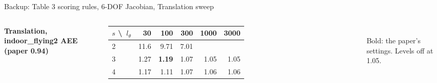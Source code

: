 \documentclass[aspectratio=169,10pt]{beamer}
\begin{document}
\begin{frame}{Backup: Table 3 scoring rules, 6-DOF Jacobian, Translation sweep}
\begin{columns}[T,onlytextwidth]
    \vspace{2mm}
    {\small\textbf{Translation, indoor\_flying2 AEE (paper 0.94)}}\\[1mm]
    \begin{tabular}{@{}lrrrrr@{}}
      \toprule
      $s$ \textbackslash\ $l_\theta$ & 30 & 100 & 300 & 1000 & 3000 \\
      \midrule
      2 & 11.6 & 9.71 & 7.01 & & \\
      3 & 1.27 & \textbf{1.19} & 1.07 & 1.05 & 1.05 \\
      4 & 1.17 & 1.11 & 1.07 & 1.06 & 1.06 \\
      \bottomrule
    \end{tabular}\\[1mm]
    Bold: the paper's settings. Levels off at 1.05.
  \end{columns}
\end{frame}
\end{document}
